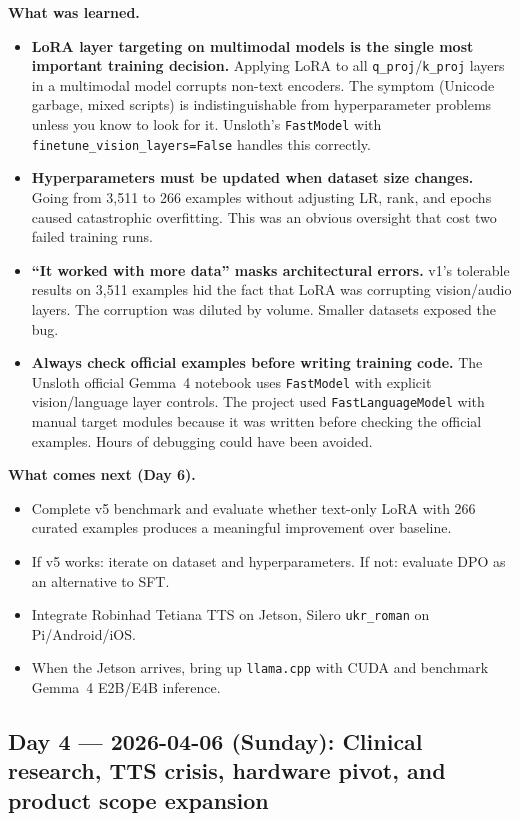 \documentclass{article}
\theoremstyle{plain}
\theoremstyle{definition}
\theoremstyle{remark}
\begin{document}
\textbf{What was learned.}
\begin{itemize}
\item \textbf{LoRA layer targeting on multimodal models is the single most important training decision.} Applying LoRA to all \texttt{q\_proj}/\texttt{k\_proj} layers in a multimodal model corrupts non-text encoders. The symptom (Unicode garbage, mixed scripts) is indistinguishable from hyperparameter problems unless you know to look for it. Unsloth's \texttt{FastModel} with \texttt{finetune\_vision\_layers=False} handles this correctly.
\item \textbf{Hyperparameters must be updated when dataset size changes.} Going from 3{,}511 to 266 examples without adjusting LR, rank, and epochs caused catastrophic overfitting. This was an obvious oversight that cost two failed training runs.
\item \textbf{``It worked with more data'' masks architectural errors.} v1's tolerable results on 3{,}511 examples hid the fact that LoRA was corrupting vision/audio layers. The corruption was diluted by volume. Smaller datasets exposed the bug.
\item \textbf{Always check official examples before writing training code.} The Unsloth official Gemma~4 notebook uses \texttt{FastModel} with explicit vision/language layer controls. The project used \texttt{FastLanguageModel} with manual target modules because it was written before checking the official examples. Hours of debugging could have been avoided.
\end{itemize}

\textbf{What comes next (Day 6).}
\begin{itemize}
\item Complete v5 benchmark and evaluate whether text-only LoRA with 266 curated examples produces a meaningful improvement over baseline.
\item If v5 works: iterate on dataset and hyperparameters. If not: evaluate DPO as an alternative to SFT.
\item Integrate Robinhad Tetiana TTS on Jetson, Silero \texttt{ukr\_roman} on Pi/Android/iOS.
\item When the Jetson arrives, bring up \texttt{llama.cpp} with CUDA and benchmark Gemma~4 E2B/E4B inference.
\end{itemize}

\subsection*{Day 4 --- 2026-04-06 (Sunday): Clinical research, TTS crisis, hardware pivot, and product scope expansion}
\end{document}
